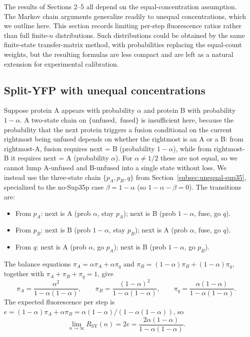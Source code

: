 \documentclass[11pt]{article}
\begin{document}
The results of Sections 2--5 all depend on the equal-concentration assumption. The Markov chain arguments generalize readily to unequal concentrations, which we outline here. This section records limiting per-step fluorescence ratios rather than full finite-$n$ distributions. Such distributions could be obtained by the same finite-state transfer-matrix method, with probabilities replacing the equal-count weights, but the resulting formulas are less compact and are left as a natural extension for experimental calibration.

\subsection{Split-YFP with unequal concentrations}
Suppose protein A appears with probability $\alpha$ and protein B with probability $1 - \alpha$. A two-state chain on $\{$unfused$, $ fused$\}$ is insufficient here, because the probability that the next protein triggers a fusion conditional on the current rightmost being unfused depends on whether the rightmost is an A or a B: from rightmost-A, fusion requires next = B (probability $1 - \alpha$), while from rightmost-B it requires next = A (probability $\alpha$). For $\alpha \neq 1/2$ these are not equal, so we cannot lump A-unfused and B-unfused into a single state without loss. We instead use the three-state chain $\{p_A, p_B, q\}$ from Section~\ref{subsec:unequal-sup35}, specialized to the no-Sup35p case $\beta = 1 - \alpha$ (so $1 - \alpha - \beta = 0$). The transitions are:
\begin{itemize}
\item From $p_A$: next is A (prob $\alpha$, stay $p_A$); next is B (prob $1{-}\alpha$, fuse, go $q$).
\item From $p_B$: next is B (prob $1{-}\alpha$, stay $p_B$); next is A (prob $\alpha$, fuse, go $q$).
\item From $q$: next is A (prob $\alpha$, go $p_A$); next is B (prob $1{-}\alpha$, go $p_B$).
\end{itemize}
The balance equations $\pi_A = \alpha \pi_A + \alpha \pi_q$ and $\pi_B = (1{-}\alpha)\pi_B + (1{-}\alpha)\pi_q$, together with $\pi_A + \pi_B + \pi_q = 1$, give
\[
\pi_A = \frac{\alpha^2}{1 - \alpha(1-\alpha)}, \qquad \pi_B = \frac{(1-\alpha)^2}{1 - \alpha(1-\alpha)}, \qquad \pi_q = \frac{\alpha(1-\alpha)}{1 - \alpha(1-\alpha)}.
\]
The expected fluorescence per step is $e = (1-\alpha)\pi_A + \alpha\pi_B = \alpha(1-\alpha)/(1 - \alpha(1-\alpha))$, so
\[
\lim_{n \to \infty} R_{\text{SY}}(n) = 2e = \frac{2\alpha(1-\alpha)}{1 - \alpha(1-\alpha)}.
\]
\end{document}
